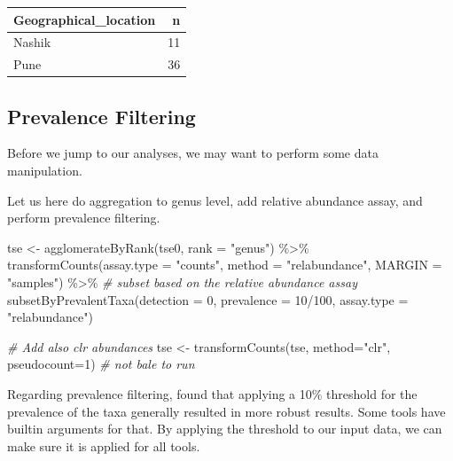 \documentclass[
]{book}
\newenvironment{Shaded}{\begin{snugshade}}{\end{snugshade}}
\newcommand{\AttributeTok}[1]{\textcolor[rgb]{0.77,0.63,0.00}{#1}}
\newcommand{\CommentTok}[1]{\textcolor[rgb]{0.56,0.35,0.01}{\textit{#1}}}
\newcommand{\DecValTok}[1]{\textcolor[rgb]{0.00,0.00,0.81}{#1}}
\newcommand{\FunctionTok}[1]{\textcolor[rgb]{0.00,0.00,0.00}{#1}}
\newcommand{\NormalTok}[1]{#1}
\newcommand{\OtherTok}[1]{\textcolor[rgb]{0.56,0.35,0.01}{#1}}
\newcommand{\SpecialCharTok}[1]{\textcolor[rgb]{0.00,0.00,0.00}{#1}}
\newcommand{\StringTok}[1]{\textcolor[rgb]{0.31,0.60,0.02}{#1}}
\begin{document}
\begin{tabular}{l|r}
\hline
Geographical\_location & n\\
\hline
Nashik & 11\\
\hline
Pune & 36\\
\hline
\end{tabular}

\hypertarget{prevalence-filtering}{%
\subsection{Prevalence Filtering}\label{prevalence-filtering}}

Before we jump to our analyses, we may want to perform some data
manipulation.

Let us here do aggregation to genus level, add relative abundance
assay, and perform prevalence filtering.

\begin{Shaded}
\begin{Highlighting}[]
\NormalTok{tse }\OtherTok{\textless{}{-}} \FunctionTok{agglomerateByRank}\NormalTok{(tse0, }\AttributeTok{rank =} \StringTok{"genus"}\NormalTok{) }\SpecialCharTok{\%\textgreater{}\%}
       \FunctionTok{transformCounts}\NormalTok{(}\AttributeTok{assay.type =} \StringTok{"counts"}\NormalTok{,}
                       \AttributeTok{method =} \StringTok{"relabundance"}\NormalTok{,}
               \AttributeTok{MARGIN =} \StringTok{"samples"}\NormalTok{) }\SpecialCharTok{\%\textgreater{}\%}
       \CommentTok{\# subset based on the relative abundance assay              }
       \FunctionTok{subsetByPrevalentTaxa}\NormalTok{(}\AttributeTok{detection =} \DecValTok{0}\NormalTok{,}
                             \AttributeTok{prevalence =} \DecValTok{10}\SpecialCharTok{/}\DecValTok{100}\NormalTok{,}
                 \AttributeTok{assay.type =} \StringTok{"relabundance"}\NormalTok{)}

\CommentTok{\# Add also clr abundances}
\NormalTok{tse }\OtherTok{\textless{}{-}} \FunctionTok{transformCounts}\NormalTok{(tse, }\AttributeTok{method=}\StringTok{"clr"}\NormalTok{, }\AttributeTok{pseudocount=}\DecValTok{1}\NormalTok{) }\CommentTok{\# not bale to run}
\end{Highlighting}
\end{Shaded}

Regarding prevalence filtering, \citet{Nearing2022} found that applying a 10\%
threshold for the prevalence of the taxa generally resulted in more
robust results. Some tools have builtin arguments for that. By
applying the threshold to our input data, we can make sure it is
applied for all tools.
\end{document}
